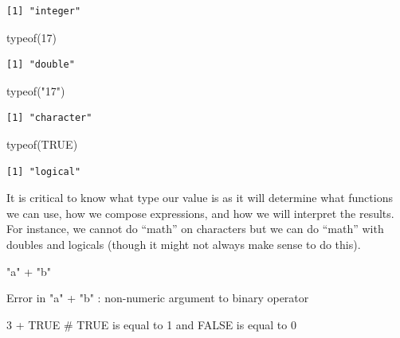 \documentclass[
  letterpaper,
  DIV=11,
  numbers=noendperiod]{scrreprt}
\newenvironment{Shaded}{\begin{snugshade}}{\end{snugshade}}
\newcommand{\CommentTok}[1]{\textcolor[rgb]{0.37,0.37,0.37}{#1}}
\newcommand{\ConstantTok}[1]{\textcolor[rgb]{0.56,0.35,0.01}{#1}}
\newcommand{\DecValTok}[1]{\textcolor[rgb]{0.68,0.00,0.00}{#1}}
\newcommand{\FunctionTok}[1]{\textcolor[rgb]{0.28,0.35,0.67}{#1}}
\newcommand{\NormalTok}[1]{\textcolor[rgb]{0.00,0.23,0.31}{#1}}
\newcommand{\SpecialCharTok}[1]{\textcolor[rgb]{0.37,0.37,0.37}{#1}}
\newcommand{\StringTok}[1]{\textcolor[rgb]{0.13,0.47,0.30}{#1}}
\begin{document}
\begin{verbatim}
[1] "integer"
\end{verbatim}

\begin{Shaded}
\begin{Highlighting}[]
\FunctionTok{typeof}\NormalTok{(}\DecValTok{17}\NormalTok{)}
\end{Highlighting}
\end{Shaded}

\begin{verbatim}
[1] "double"
\end{verbatim}

\begin{Shaded}
\begin{Highlighting}[]
\FunctionTok{typeof}\NormalTok{(}\StringTok{"17"}\NormalTok{)}
\end{Highlighting}
\end{Shaded}

\begin{verbatim}
[1] "character"
\end{verbatim}

\begin{Shaded}
\begin{Highlighting}[]
\FunctionTok{typeof}\NormalTok{(}\ConstantTok{TRUE}\NormalTok{)}
\end{Highlighting}
\end{Shaded}

\begin{verbatim}
[1] "logical"
\end{verbatim}

It is critical to know what type our value is as it will determine what
functions we can use, how we compose expressions, and how we will
interpret the results. For instance, we cannot do ``math'' on characters
but we can do ``math'' with doubles and logicals (though it might not
always make sense to do this).

\begin{Shaded}
\begin{Highlighting}[]
\StringTok{"a"} \SpecialCharTok{+} \StringTok{"b"}
\end{Highlighting}
\end{Shaded}

{Error in "a" + "b" : non-numeric argument to binary operator}

\begin{Shaded}
\begin{Highlighting}[]
\DecValTok{3} \SpecialCharTok{+} \ConstantTok{TRUE} \CommentTok{\# TRUE is equal to 1 and FALSE is equal to 0}
\end{Highlighting}
\end{Shaded}
\end{document}
